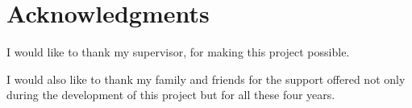 
		



\bigskip

\begingroup
\let\clearpage\relax
\let\cleardoublepage\relax
\let\cleardoublepage\relax
\chapter*{Acknowledgments}
\smallskip

I would like to thank my supervisor, \myProf for making this project possible.

\bigskip

I would also like to thank my family and friends for the support offered not only during the development of this project but for all these four years.




\endgroup



